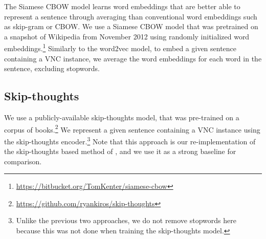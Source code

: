 \documentclass[11pt,a4paper]{article}
\begin{document}
The Siamese CBOW model \cite{kenter-borisov-derijke} learns word
embeddings that are better able to represent a sentence through
averaging than conventional word embeddings such as skip-gram or
CBOW. We use a Siamese CBOW model that was pretrained on a snapshot of
Wikipedia from November 2012 using randomly initialized word
embeddings.\footnote{\url{https://bitbucket.org/TomKenter/siamese-cbow}}
Similarly to the word2vec model, to embed a given sentence containing
a VNC instance, we average the word embeddings for each word in the
sentence, excluding stopwords.



\subsection{Skip-thoughts}
%


We use a publicly-available skip-thoughts model, that was pre-trained
on a corpus of
books.\footnote{\url{https://github.com/ryankiros/skip-thoughts}} We
represent a given sentence containing a VNC instance using the
skip-thoughts encoder.\footnote{Unlike the previous two approaches, we
  do not remove stopwords here because this was not done when training
  the skip-thoughts model.}
Note that this approach is our re-implementation of the skip-thoughts
based method of , and we use it as a
strong baseline for comparison.


\end{document}
